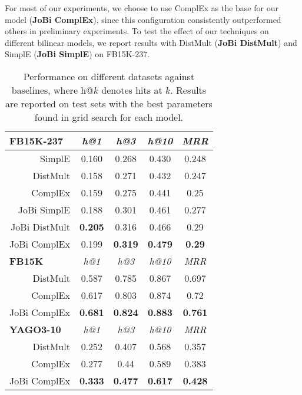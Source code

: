 \documentclass[11pt,a4paper, dvipsnames]{article}
\begin{document}
For most of our experiments, we choose to use ComplEx as the base for our model (\textbf{JoBi ComplEx}), since this configuration consistently outperformed others in preliminary experiments. To test the effect of our techniques on different bilinear models, we report results with DistMult (\textbf{JoBi DistMult}) and SimplE (\textbf{JoBi SimplE}) on FB15K-237. 


\begin{table}[t!] \centering
    \small
    \begin{tabular}{r | c c c c  }
     \hline \hline
      \multicolumn{1}{l|}{\textbf{FB15K-237}}  & \textit{h@1} & \textit{h@3} & \textit{h@10} & \textit{MRR} \\
         \hline
         SimplE & 0.160 & 0.268 & 0.430 & 0.248 \\
         DistMult & 0.158 & 0.271 & 0.432 & 0.247  \\
         ComplEx & 0.159 & 0.275 & 0.441 &0.25 \\ 
         JoBi SimplE  & 0.188 & 0.301 & 0.461 & 0.277 \\
         JoBi DistMult  & \textbf{0.205} & 0.316 & 0.466 & 0.29 \\
         JoBi ComplEx  & 0.199 & \textbf{0.319} & \textbf{0.479} & \textbf{0.29}  \\
         \hline \hline
       \multicolumn{1}{l|}{\textbf{FB15K}}  & \textit{h@1} & \textit{h@3} & \textit{h@10} & \textit{MRR} \\
         \hline 
         DistMult & 0.587 & 0.785 & 0.867 & 0.697 \\
         ComplEx & 0.617 & 0.803  & 0.874 & 0.72 \\ 
         JoBi ComplEx  & \textbf{0.681} & \textbf{0.824} & \textbf{0.883} & \textbf{0.761}  \\
         \hline \hline
       \multicolumn{1}{l|}{\textbf{YAGO3-10}}  & \textit{h@1} & \textit{h@3} & \textit{h@10} & \textit{MRR} \\
         \hline
         DistMult & 0.252 & 0.407 & 0.568 & 0.357 \\
         ComplEx & 0.277 & 0.44 & 0.589 & 0.383 \\ 
         JoBi ComplEx  & \textbf{0.333} & \textbf{0.477} & \textbf{0.617} & \textbf{0.428}  \\
         
    \end{tabular}
    \caption{Performance on different datasets against baselines, where h@$k$ denotes hits at $k$. Results are reported on test sets with the best parameters found in grid search for each model.}
    \label{tab:smalldatasets}
\end{table}
\end{document}
